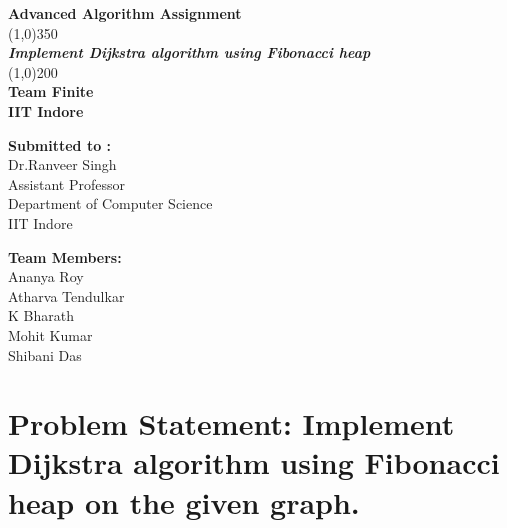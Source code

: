 \documentclass{article}
\begin{document}
\begin{titlepage}

	\begin{center}
	
	\huge{\bfseries Advanced Algorithm Assignment}\\
	[1cm]
	\line(1,0){350}\\
	[0.15in]
	\textit{\huge{\bfseries{ Implement Dijkstra algorithm using Fibonacci heap}}}\\
	\line(1,0){200}\\
	[1cm]
	\textrm{\bfseries{\LARGE Team Finite}}\\
	[1cm]
	\textrm{\bfseries{\LARGE IIT Indore}}\\
	[8.2cm]
	\end{center}
	\begin{minipage}{0.25\linewidth}
	\begin{flushright}
	\textrm{\large
	{\bfseries Submitted to :}
	\\Dr.Ranveer Singh
	\\Assistant Professor
	\\Department of Computer Science
	\\IIT Indore
	}
	\end{flushright}
	\end{minipage}
	\hfill
	\begin{minipage}{0.25\linewidth}
	\begin{flushleft}
	\textrm{\large
	{\bfseries Team Members:}
	\\ Ananya Roy 
	\\Atharva Tendulkar
	\\K Bharath
	\\Mohit Kumar
	\\Shibani Das}
	\end{flushleft}
	\end{minipage}

\end{titlepage}

\tableofcontents
\thispagestyle{empty}
\cleardoublepage
\setcounter{page}{1}

\section*{Problem Statement: Implement Dijkstra algorithm using Fibonacci heap on the given graph.}\label{sec:spanning}
\end{document}
